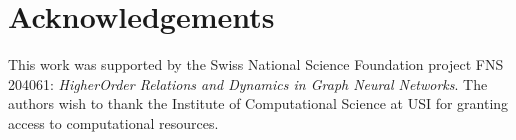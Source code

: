\section*{Acknowledgements}

This work was supported by the Swiss National Science Foundation project FNS 204061: \emph{HigherOrder Relations and Dynamics in Graph Neural Networks}. The authors wish to thank the Institute of Computational Science at USI for granting access to computational resources.